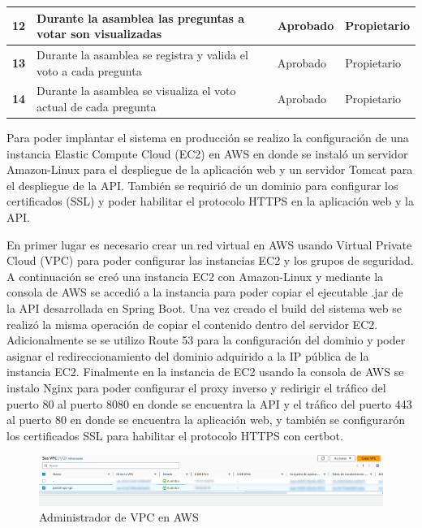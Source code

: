 \begin{footnotesize}
\begin{spacing}{1}
\begin{center}
\begin{longtable}{ |>{\bfseries}l|p{}|l|l| }
        \hline
        12 & Durante la asamblea las preguntas a votar son visualizadas & Aprobado & Propietario\\
        \hline
        13 & Durante la asamblea se registra y valida el voto a cada pregunta & Aprobado & Propietario\\
        \hline
        14 & Durante la asamblea se visualiza el voto actual de cada pregunta & Aprobado & Propietario\\
        \hline
    \end{longtable}\label{tab:pruebas-aceptacion-3}
    \end{center}
\end{spacing}
\end{footnotesize}

Para poder implantar el sistema en producción se realizo la configuración de una instancia Elastic Compute Cloud (EC2) en AWS en donde se instaló un servidor Amazon-Linux para el despliegue de la aplicación web y un servidor Tomcat para el despliegue de la API.
También se requirió de un dominio para configurar los certificados (SSL) y poder habilitar el protocolo HTTPS en la aplicación web y la API.

En primer lugar es necesario crear un red virtual en AWS usando Virtual Private Cloud (VPC) para poder configurar las instancias EC2 y los grupos de seguridad.
A continuación se creó una instancia EC2 con Amazon-Linux y mediante la consola de AWS se accedió a la instancia para poder copiar el ejecutable .jar de la API desarrollada en Spring Boot.
Una vez creado el build del sistema web se realizó la misma operación de copiar el contenido dentro del servidor EC2.
Adicionalmente se se utilizo Route 53 para la configuración del dominio y poder asignar el redireccionamiento del dominio adquirido a la IP pública de la instancia EC2.
Finalmente en la instancia de EC2 usando la consola de AWS se instalo Nginx para poder configurar el proxy inverso y redirigir el tráfico del puerto 80 al puerto 8080 en donde se encuentra la API y el tráfico del puerto 443 al puerto 80 en donde se encuentra la aplicación web, y también se configurarón los certificados SSL para habilitar el protocolo HTTPS con certbot.

\begin{figure}[H]
    \centering
    \includegraphics[width=1\textwidth]{resources/images/aws-vpc}
    \caption{Administrador de VPC en AWS}
    \label{fig:vpc}
\end{figure}

